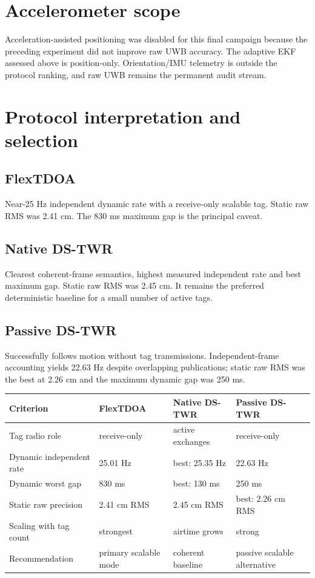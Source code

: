 \documentclass[10pt,a4paper]{article}
\begin{document}
\section{Accelerometer scope}
Acceleration-assisted positioning was disabled for this final campaign because
the preceding experiment did not improve raw UWB accuracy. The adaptive EKF
assessed above is position-only. Orientation/IMU telemetry is outside the
protocol ranking, and raw UWB remains the permanent audit stream.

\section{Protocol interpretation and selection}
\subsection{FlexTDOA}
Near-25 Hz independent dynamic rate with a receive-only scalable tag. Static
raw RMS was 2.41 cm. The 830 ms maximum gap is the principal caveat.

\subsection{Native DS-TWR}
Clearest coherent-frame semantics, highest measured independent rate and best
maximum gap. Static raw RMS was 2.45 cm. It remains the preferred deterministic
baseline for a small number of active tags.

\subsection{Passive DS-TWR}
Successfully follows motion without tag transmissions. Independent-frame
accounting yields 22.63 Hz despite overlapping publications; static raw RMS was
the best at 2.26 cm and the maximum dynamic gap was 250 ms.

\begin{center}\small
\begin{tabular}{p{}p{}p{}p{}}
\toprule
Criterion & FlexTDOA & Native DS-TWR & Passive DS-TWR\\
\midrule
Tag radio role & receive-only & active exchanges & receive-only\\
Dynamic independent rate & 25.01 Hz & best: 25.35 Hz & 22.63 Hz\\
Dynamic worst gap & 830 ms & best: 130 ms & 250 ms\\
Static raw precision & 2.41 cm RMS & 2.45 cm RMS & best: 2.26 cm RMS\\
Scaling with tag count & strongest & airtime grows & strong\\
Recommendation & primary scalable mode & coherent baseline & passive scalable alternative\\
\bottomrule
\end{tabular}
\end{center}
\end{document}
